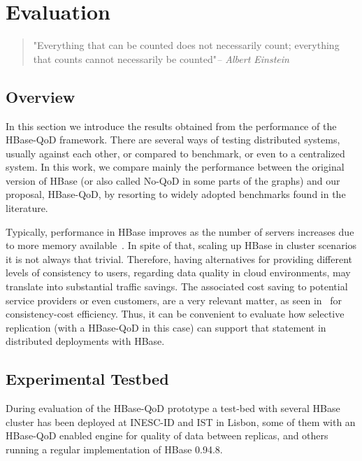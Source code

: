 
\chapter{Evaluation}
\label{ch:evaluation}

\begin{quotation}
  {\small\it }"Everything that can be counted does not necessarily count; everything that counts cannot necessarily be counted"{\small\it -- Albert Einstein }
\end{quotation}



\section{Overview}
In this section we introduce the results obtained from the performance of the HBase-QoD framework. There are several ways of testing distributed systems, usually against each other, or compared to benchmark, or even to a centralized system. In this work, we compare mainly  the performance between the original version of HBase (or also called No-QoD in some parts of the graphs) and our proposal, HBase-QoD, by resorting to widely adopted benchmarks found in the literature.

Typically, performance in HBase improves as the number of servers increases due to more memory available~\cite{Carstoiu:2010}. In spite of that, scaling up HBase in cluster scenarios it is not always that trivial. Therefore, having alternatives for providing different levels of consistency to users, regarding data quality in cloud environments, may translate into substantial traffic savings. The associated cost saving to potential service providers or even customers, are a very relevant matter,  as seen in~\cite{chihoub:2013} for consistency-cost efficiency. Thus, it can be convenient to evaluate how selective replication (with a HBase-QoD in this case) can support that statement in distributed deployments with HBase.

\section{Experimental Testbed}
During evaluation of the HBase-QoD prototype a test-bed with several HBase cluster has been deployed at INESC-ID and IST in Lisbon, some of them with an HBase-QoD enabled engine for quality of data between replicas, and others running a regular implementation of HBase 0.94.8.

